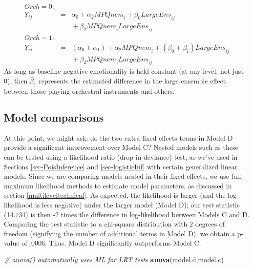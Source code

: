 \documentclass[
]{krantz}
\newenvironment{Shaded}{\begin{snugshade}}{\end{snugshade}}
\newcommand{\CommentTok}[1]{\textcolor[rgb]{0.37,0.37,0.37}{\textit{#1}}}
\newcommand{\KeywordTok}[1]{\textcolor[rgb]{0.27,0.27,0.27}{\textbf{#1}}}
\newcommand{\NormalTok}[1]{#1}
\begin{document}
\begin{itemize}
  \begin{eqnarray*}
  \textstyle{Orch}=0: & & \\
  Y_{ij} & = & \alpha_{0}+\alpha_{2}\textstyle{MPQnem}_{i}+\beta_{0}\textstyle{LargeEns}_{ij} \\
   & & \textrm{} +\beta_{2}\textstyle{MPQnem}_{i}\textstyle{LargeEns}_{ij} \\
  \textstyle{Orch}=1: & & \\
  Y_{ij} & = & (\alpha_{0}+\alpha_{1})+\alpha_{2}\textstyle{MPQnem}_{i}+(\beta_{0}+\beta_{1})\textstyle{LargeEns}_{ij} \\
   & & \textrm{} +\beta_{2}\textstyle{MPQnem}_{i}\textstyle{LargeEns}_{ij}
  \end{eqnarray*}
  As long as baseline negative emotionality is held constant (at any level, not just 0), then \(\hat{\beta}_{1}\) represents the estimated difference in the large ensemble effect between those playing orchestral instruments and others.
\end{itemize}

\hypertarget{compare:modeld}{%
\subsection{Model comparisons}\label{compare:modeld}}

At this point, we might ask: do the two extra fixed effects terms in Model D provide a significant improvement over Model C? Nested models such as these can be tested using a likelihood ratio (drop in deviance) test, as we've used in Sections \ref{sec-PoisInference} and \ref{sec-logisticInf} with certain generalized linear models. Since we are comparing models nested in their fixed effects, we use full maximum likelihood methods to estimate model parameters, as discussed in section \ref{multileveltechnical}. As expected, the likelihood is larger (and the log-likelihood is less negative) under the larger model (Model D); our test statistic (14.734) is then -2 times the difference in log-likelihood between Models C and D. Comparing the test statistic to a chi-square distribution with 2 degrees of freedom (signifying the number of additional terms in Model D), we obtain a p-value of .0006. Thus, Model D significantly outperforms Model C.

\begin{Shaded}
\begin{Highlighting}[]
\CommentTok{# anova() automatically uses ML for LRT tests}
\KeywordTok{anova}\NormalTok{(model.d,model.c)}
\end{Highlighting}
\end{Shaded}
\end{document}
